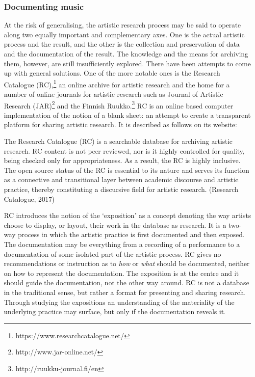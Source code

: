 \hypertarget{documenting-music}{%
\subsubsection{Documenting music}\label{documenting-music}}

At the risk of generalising, the artistic research process may be said
to operate along two equally important and complementary axes. One is
the actual artistic process and the result, and the other is the
collection and preservation of data and the documentation of the result.
The knowledge and the means for archiving them, however, are still
insufficiently explored. There have been attempts to come up with
general solutions. One of the more notable ones is the Research
Catalogue (RC),\footnote{https://www.researchcatalogue.net/} an online
archive for artistic research and the home for a number of online
journals for artistic research such as Journal of Artistic Research
(JAR)\footnote{http://www.jar-online.net/} and the Finnish
Ruukko.\footnote{http://ruukku-journal.fi/en} RC is an online based
computer implementation of the notion of a blank sheet: an attempt to
create a transparent platform for sharing artistic research. It is
described as follows on its website:

The Research Catalogue (RC) is a searchable database for archiving
artistic research. RC content is not peer reviewed, nor is it highly
controlled for quality, being checked only for appropriateness. As a
result, the RC is highly inclusive. The open source status of the RC is
essential to its nature and serves its function as a connective and
transitional layer between academic discourse and artistic practice,
thereby constituting a discursive field for artistic research. (Research
Catalogue, 2017)

RC introduces the notion of the `exposition' as a concept denoting the
way artists choose to display, or layout, their work in the database as
research. It is a two-way process in which the artistic practice is
first documented and then exposed. The documentation may be everything
from a recording of a performance to a documentation of some isolated
part of the artistic process. RC gives no recommendations or instruction
as to \emph{how} or \emph{what} should be documented, neither on how to
represent the documentation. The exposition is at the centre and it
should guide the documentation, not the other way around. RC is not a
database in the traditional sense, but rather a format for presenting
and sharing research. Through studying the expositions an understanding
of the materiality of the underlying practice may surface, but only if
the documentation reveals it.

